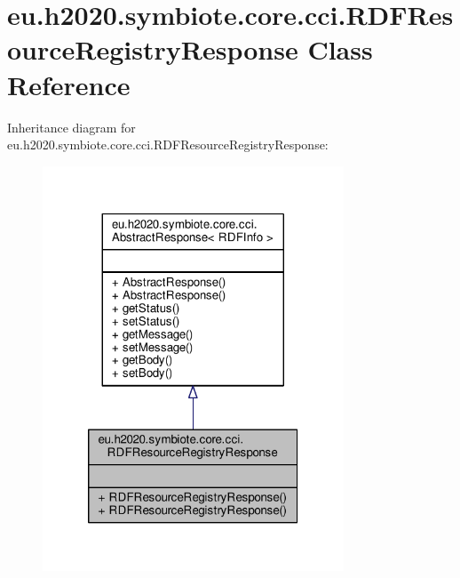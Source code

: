 \hypertarget{classeu_1_1h2020_1_1symbiote_1_1core_1_1cci_1_1RDFResourceRegistryResponse}{}\section{eu.\+h2020.\+symbiote.\+core.\+cci.\+R\+D\+F\+Resource\+Registry\+Response Class Reference}
\label{classeu_1_1h2020_1_1symbiote_1_1core_1_1cci_1_1RDFResourceRegistryResponse}


Inheritance diagram for eu.\+h2020.\+symbiote.\+core.\+cci.\+R\+D\+F\+Resource\+Registry\+Response\+:\nopagebreak
\begin{figure}[H]
\begin{center}
\leavevmode
\includegraphics[width=254pt]{classeu_1_1h2020_1_1symbiote_1_1core_1_1cci_1_1RDFResourceRegistryResponse__inherit__graph}
\end{center}
\end{figure}



